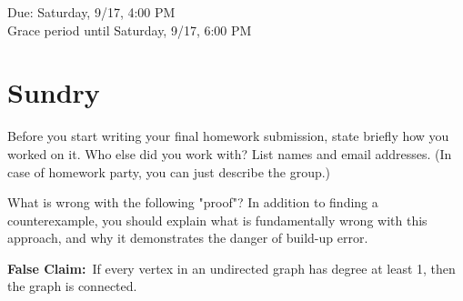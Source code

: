 \documentclass[11pt]{article}
\begin{document}
\maketitle
\fontsize{12}{15}\selectfont

\begin{center}
    Due: Saturday, 9/17, 4:00 PM \\
    Grace period until Saturday, 9/17, 6:00 PM \\
\end{center}

\section*{Sundry}
Before you start writing your final homework submission, state briefly how you worked on it.  Who else did you work with?  List names and email addresses.  (In case of homework party, you can just describe the group.)

{}

\vspace{15pt}


What is wrong with the following "proof"? In addition to finding a counterexample, you should explain what is fundamentally wrong with this approach, and why it demonstrates the danger of build-up error.

\textbf{False Claim:}~If every vertex in an undirected graph has degree at least 1, then the graph is connected.
\end{document}

